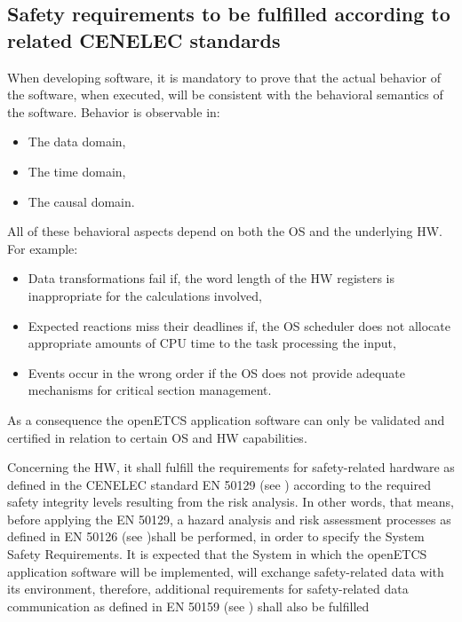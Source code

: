 \documentclass{template/openetcs_report}
\begin{document}
\subsection{Safety requirements to be fulfilled according to related CENELEC standards}
When developing software, it is mandatory to prove that the actual behavior of the software, when executed, will be consistent with the behavioral semantics of the software. 
Behavior is observable in: 
\begin{itemize}\itemsep=0pt
  \item The data domain,
  \item The time domain,
  \item The causal domain.
\end{itemize}

All of these behavioral aspects depend on both the OS and the underlying HW. For example:
\begin{itemize}\itemsep=0pt
  \item Data transformations fail if, the word length of the HW registers is inappropriate for the calculations involved,
  \item Expected reactions miss their deadlines if, the OS scheduler does not allocate appropriate amounts of CPU time to the task processing the input,
  \item Events occur in the wrong order if the OS does not provide adequate mechanisms for critical section management.
\end{itemize}

As a consequence the openETCS application software can only be validated and certified in relation to certain OS and HW capabilities.

Concerning the HW, it shall fulfill the requirements for safety-related hardware as defined in the CENELEC standard EN 50129 (see \cite{EN50129}) according to the required safety integrity levels resulting from the risk analysis. In other words, that means, before applying the EN 50129, a hazard analysis and risk assessment processes as defined in EN 50126 (see \cite{EN50126})shall be performed, in order to specify the System Safety Requirements.
It is expected that the System in which the openETCS application software will be implemented, will exchange safety-related data with its environment, therefore, additional requirements for safety-related data communication as defined in EN 50159 (see \cite{EN50159}) shall also be fulfilled
\end{document}
